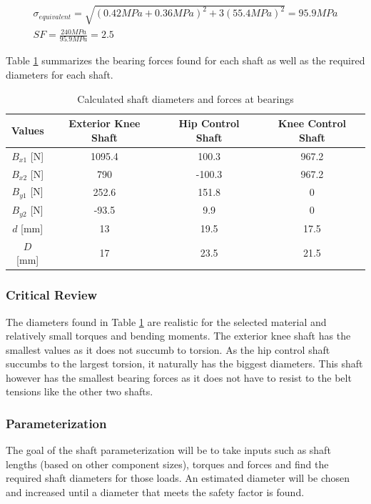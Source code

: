 \begin{gather}
    \sigma_{equivalent}=\sqrt{(0.42 MPa+0.36 MPa)^2+3(55.4 MPa)^2}=95.9 MPa
    \\
    SF=\frac{240 MPa}{95.9 MPa}=2.5
\end{gather}

Table \ref{tab:shaft} summarizes the bearing forces found for each shaft as well as the required diameters for each shaft. 

\begin{table}[H]
    \centering
    \caption{Calculated shaft diameters and forces at bearings}
    \label{tab:shaft}
    \begin{tabular}{c c c c}
        \\ \hline
        \textbf{Values} & \textbf{Exterior Knee Shaft} & \textbf{Hip Control Shaft} & \textbf{Knee Control Shaft}
        \\ \hline
        $B_{x1}$ [N] & 1095.4 & 100.3 & 967.2
        \\
        $B_{x2}$ [N] & 790 & -100.3 & 967.2
        \\
        $B_{y1}$ [N]& 252.6 & 151.8 & 0
        \\
        $B_{y2}$ [N]& -93.5 & 9.9 & 0
        \\
        $d$ [mm]& 13 & 19.5 & 17.5
        \\
        $D$ [mm]& 17 & 23.5 & 21.5
        \\ \hline
    \end{tabular}
\end{table}

\subsubsection{Critical Review}
The diameters found in Table \ref{tab:shaft} are realistic for the selected material and relatively small torques and bending moments. The exterior knee shaft has the smallest values as it does not succumb to torsion. As the hip control shaft succumbs to the largest torsion, it naturally has the biggest diameters. This shaft however has the smallest bearing forces as it does not have to resist to the belt tensions like the other two shafts.

\subsubsection{Parameterization}
The goal of the shaft parameterization will be to take inputs such as shaft lengths (based on other component sizes), torques and forces and find the required shaft diameters for those loads. An estimated diameter will be chosen and increased until a diameter that meets the safety factor is found. 